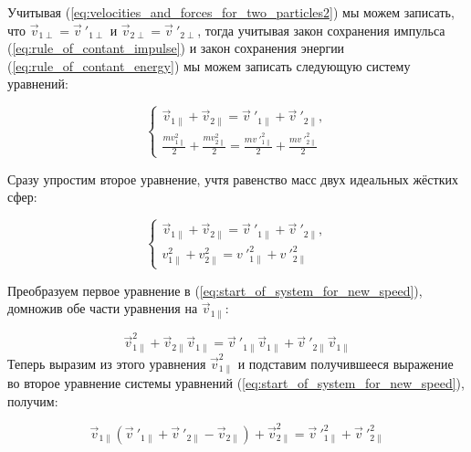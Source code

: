\documentclass[a4paper]{article}
\begin{document}
Учитывая (\ref{eq:velocities_and_forces_for_two_particles2}) мы можем записать, что $ \vec{v}_{1\perp} = \vec{v}\ '_{1\perp} $ и $ \vec{v}_{2\perp} = \vec{v}\ '_{2\perp} $, тогда учитывая закон сохранения импульса (\ref{eq:rule_of_contant_impulse}) и закон сохранения энергии (\ref{eq:rule_of_contant_energy}) мы можем записать следующую систему уравнений:

\begin{equation}
    \begin{cases}
        \vec{v}_{1\parallel} + \vec{v}_{2\parallel} = \vec{v}\ '_{1\parallel} + \vec{v}\ '_{2\parallel},
        \\
        \displaystyle\frac{mv^2_{1\parallel}}{2} + \displaystyle\frac{mv^2_{2\parallel}}{2} = \displaystyle\frac{mv\ '^2_{1\parallel}}{2} + \displaystyle\frac{mv\ '^2_{2\parallel}}{2}
    \end{cases}
\end{equation}

Сразу упростим второе уравнение, учтя равенство масс двух идеальных жёстких сфер:

\begin{equation}\label{eq:start_of_system_for_new_speed}
    \begin{cases}
        \vec{v}_{1\parallel} + \vec{v}_{2\parallel} = \vec{v}\ '_{1\parallel} + \vec{v}\ '_{2\parallel},
        \\
        v^2_{1\parallel} + v^2_{2\parallel} = v\ '^2_{1\parallel} + v\ '^2_{2\parallel}
    \end{cases}
\end{equation}

Преобразуем первое уравнение в (\ref{eq:start_of_system_for_new_speed}), домножив обе части уравнения на $ \vec{v}_{1\parallel} $:

\begin{equation}
    \vec{v}^2_{1\parallel} + \vec{v}_{2\parallel}\vec{v}_{1\parallel} = \vec{v}\ '_{1\parallel}\vec{v}_{1\parallel} + \vec{v}\ '_{2\parallel}\vec{v}_{1\parallel}
\end{equation}
Теперь выразим из этого уравнения $ \vec{v}^2_{1\parallel} $ и подставим получившееся выражение во второе уравнение системы уравнений (\ref{eq:start_of_system_for_new_speed}), получим:

\begin{equation}
    \vec{v}_{1\parallel}(\vec{v}\ '_{1\parallel} + \vec{v}\ '_{2\parallel} - \vec{v}_{2\parallel}) + \vec{v}^2_{2\parallel} = \vec{v}\ '^2_{1\parallel} + \vec{v}\ '^2_{2\parallel}
\end{equation}
\end{document}

